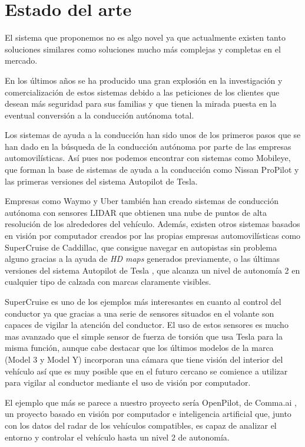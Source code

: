 \section{Estado del arte}\label{sec:stateoftheart}

El sistema que proponemos no es algo novel ya que actualmente existen tanto soluciones similares como soluciones mucho más complejas y completas en el mercado.

En los últimos años se ha producido una gran explosión en la investigación y comercialización de estos sistemas debido a las peticiones de los clientes que desean más seguridad para sus familias y que tienen la mirada puesta en la eventual conversión a la conducción autónoma total.

Los sistemas de ayuda a la conducción han sido unos de los primeros pasos que se han dado en la búsqueda de la conducción autónoma por parte de las empresas automovilísticas. Así pues nos podemos encontrar con sistemas como Mobileye\cite{yoffie2014mobileye}, que forman la base de sistemas de ayuda a la conducción como Nissan ProPilot y las primeras versiones del sistema Autopilot de Tesla.

Empresas como Waymo y Uber también han creado sistemas de conducción autónoma con sensores LIDAR que obtienen una nube de puntos de alta resolución de los alrededores del vehículo.
Además, existen otros sistemas basados en visión por computador creados por las propias empresas automovilísticas como SuperCruise de Caddillac, que consigue navegar en autopistas sin problema alguno gracias a la ayuda de \textit{HD maps} generados previamente\cite{CaddillacSupercruise}, o las últimas versiones del sistema Autopilot de Tesla \cite{teslaAutopilot}, que alcanza un nivel de autonomía 2 en cualquier tipo de calzada con marcas claramente visibles.

SuperCruise es uno de los ejemplos más interesantes en cuanto al control del conductor ya que gracias a una serie de sensores situados en el volante son capaces de vigilar la atención del conductor. El uso de estos sensores es mucho mas avanzado que el simple sensor de fuerza de torsión que usa Tesla para la misma función, aunque cabe destacar que los últimos modelos de la marca (Model 3 y Model Y) incorporan una cámara que tiene visión del interior del vehículo \cite{manualModel3} así que es muy posible que en el futuro cercano se comience a utilizar para vigilar al conductor mediante el uso de visión por computador.

El ejemplo que más se parece a nuestro proyecto sería OpenPilot, de Comma.ai \cite{openpilot}, un proyecto basado en visión por computador e inteligencia artificial que, junto con los datos del radar de los vehículos compatibles, es capaz de analizar el entorno y controlar el vehículo hasta un nivel 2 de autonomía.

